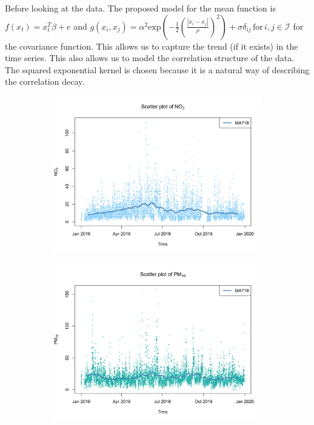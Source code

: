 \documentclass[a4paper, 10pt]{article}
\begin{document}
\begin{flushleft}
      \vspace{1em}

      Before looking at the data. The proposed model for the mean function is $f(x_{t}) = x_{t}^{T} \beta + e$ and $g(x_{i}, x_{j}) = \alpha^{2} \text{exp}(- \frac{1}{2} (\frac{|x_i - x_j|}{\rho})^2) + \sigma\delta_{ij} \, \text{for} \, i,j \in \mathcal{I}$ for the covariance function. This allows us to capture the trend (if it exists) in the time series. This also allows us to model the correlation structure of the data. The squared exponential kernel is chosen because it is a natural way of describing the correlation decay.

      \begin{figure}[H]
         \centering
         \begin{subfigure}[t]{0.48\linewidth}
            \centering
            \includegraphics[width=\linewidth]{../images/no2_scatter_2019.png}
         \end{subfigure}
         \hfill
         \begin{subfigure}[t]{0.48\linewidth}
            \centering
            \includegraphics[width=\linewidth]{../images/pm10_scatter_2019.png}
         \end{subfigure}


\end{figure}
\end{flushleft}
\end{document}
